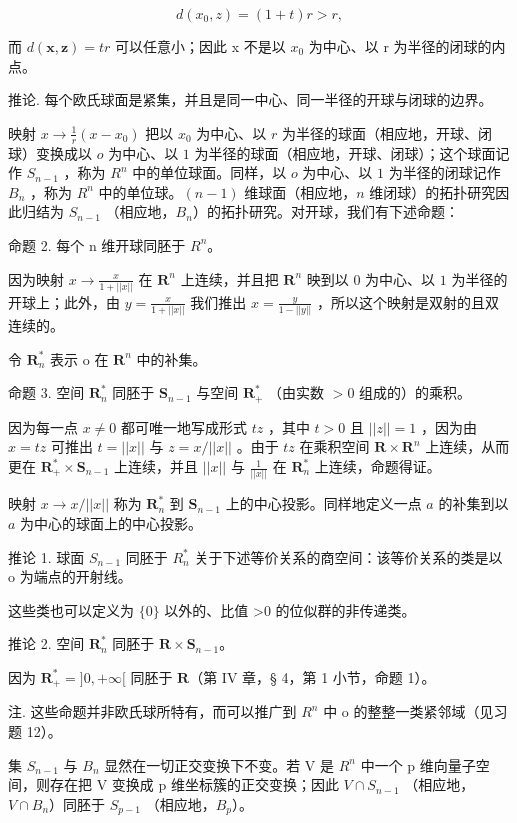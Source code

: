 \[
d (x _ {0}, z) = (1 + t) r > r,
\]

而 \(d(\boldsymbol{x}, \boldsymbol{z}) = tr\) 可以任意小；因此 x 不是以 \(x_{0}\) 为中心、以 r 为半径的闭球的内点。

推论. 每个欧氏球面是紧集，并且是同一中心、同一半径的开球与闭球的边界。

映射 \(x \to \frac{1}{r} (x - x_0)\) 把以 \(x_0\) 为中心、以 \(r\) 为半径的球面（相应地，开球、闭球）变换成以 \(o\) 为中心、以 \(1\) 为半径的球面（相应地，开球、闭球）；这个球面记作 \(S_{n-1}\) ，称为 \(R^n\) 中的单位球面。同样，以 \(o\) 为中心、以 \(1\) 为半径的闭球记作 \(B_n\) ，称为 \(R^n\) 中的单位球。\((n - 1)\) 维球面（相应地，\(n\) 维闭球）的拓扑研究因此归结为 \(S_{n-1}\) （相应地，\(B_n\)）的拓扑研究。对开球，我们有下述命题：

命题 2. 每个 n 维开球同胚于 \(R^{n}\)。

因为映射 \(x \to \frac{x}{1 + ||x||}\) 在 \(\mathbf{R}^n\) 上连续，并且把 \(\mathbf{R}^n\) 映到以 \(0\) 为中心、以 \(1\) 为半径的开球上；此外，由 \(y = \frac{x}{1 + ||x||}\) 我们推出 \(x = \frac{y}{1 - ||y||}\) ，所以这个映射是双射的且双连续的。

令 \(\mathbf{R}_n^*\) 表示 o 在 \(\mathbf{R}^n\) 中的补集。

命题 3. 空间 \(\mathbf{R}_n^*\) 同胚于 \(\mathbf{S}_{n-1}\) 与空间 \(\mathbf{R}_+^*\) （由实数 \(>0\) 组成的）的乘积。

因为每一点 \(x \neq 0\) 都可唯一地写成形式 \(tz\) ，其中 \(t > 0\) 且 \(||z|| = 1\) ，因为由 \(x = tz\) 可推出 \(t = ||x||\) 与 \(z = x / ||x||\) 。由于 \(tz\) 在乘积空间 \(\mathbf{R} \times \mathbf{R}^n\) 上连续，从而更在 \(\mathbf{R}_+^* \times \mathbf{S}_{n-1}\) 上连续，并且 \(||x||\) 与 \(\frac{1}{||x||}\) 在 \(\mathbf{R}_n^*\) 上连续，命题得证。

映射 \(x \to x / ||x||\) 称为 \(\mathbf{R}_n^*\) 到 \(\mathbf{S}_{n-1}\) 上的中心投影。同样地定义一点 \(a\) 的补集到以 \(a\) 为中心的球面上的中心投影。

推论 1. 球面 \(S_{n-1}\) 同胚于 \(R_{n}^{*}\) 关于下述等价关系的商空间：该等价关系的类是以 o 为端点的开射线。

这些类也可以定义为 \(\{0\}\) 以外的、比值 \textgreater0 的位似群的非传递类。

推论 2. 空间 \(\mathbf{R}_n^*\) 同胚于 \(\mathbf{R} \times \mathbf{S}_{n-1}\)。

因为 \(\mathbf{R}_{+}^{*} = ]0, +\infty[\) 同胚于 \(\mathbf{R}\)（第 IV 章，§ 4，第 1 小节，命题 1）。

注. 这些命题并非欧氏球所特有，而可以推广到 \(R^{n}\) 中 o 的整整一类紧邻域（见习题 12）。

集 \(S_{n-1}\) 与 \(B_{n}\) 显然在一切正交变换下不变。若 V 是 \(R^{n}\) 中一个 p 维向量子空间，则存在把 V 变换成 p 维坐标簇的正交变换；因此 \(V \cap S_{n-1}\) （相应地，\(V \cap B_{n}\)）同胚于 \(S_{p-1}\) （相应地，\(B_{p}\)）。

